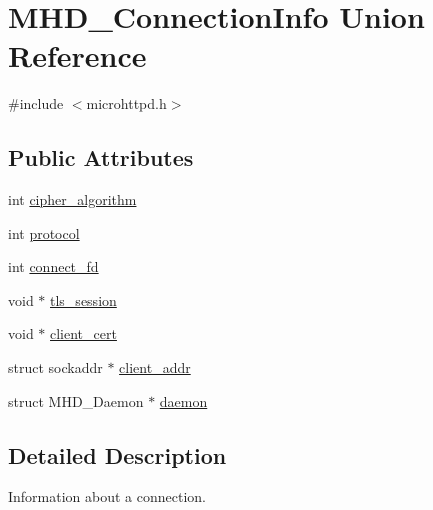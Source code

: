\hypertarget{unionMHD__ConnectionInfo}{\section{\-M\-H\-D\-\_\-\-Connection\-Info \-Union \-Reference}
\label{unionMHD__ConnectionInfo}
}


{\ttfamily \#include $<$microhttpd.\-h$>$}

\subsection*{\-Public \-Attributes}
\begin{DoxyCompactItemize}
\item 
int \hyperlink{unionMHD__ConnectionInfo_a0728c9f1a9c48cc61811e45b019999b1}{cipher\-\_\-algorithm}
\item 
int \hyperlink{unionMHD__ConnectionInfo_a493d7db4e3d5a8a9f3f89b8269d5b6ed}{protocol}
\item 
int \hyperlink{unionMHD__ConnectionInfo_a4bf6e893d4c039ab6d3a5809576af01d}{connect\-\_\-fd}
\item 
void $\ast$ \hyperlink{unionMHD__ConnectionInfo_ab89cf1c30cc2dec2e43d081e7e40811d}{tls\-\_\-session}
\item 
void $\ast$ \hyperlink{unionMHD__ConnectionInfo_a82eb5004c18287649f22a520482d3eb3}{client\-\_\-cert}
\item 
struct sockaddr $\ast$ \hyperlink{unionMHD__ConnectionInfo_ac169bc869c7d5d14d78946360309192d}{client\-\_\-addr}
\item 
struct \-M\-H\-D\-\_\-\-Daemon $\ast$ \hyperlink{unionMHD__ConnectionInfo_a4f4bebd55f1052ec78275c5bfec06e98}{daemon}
\end{DoxyCompactItemize}


\subsection{\-Detailed \-Description}
\-Information about a connection. 

